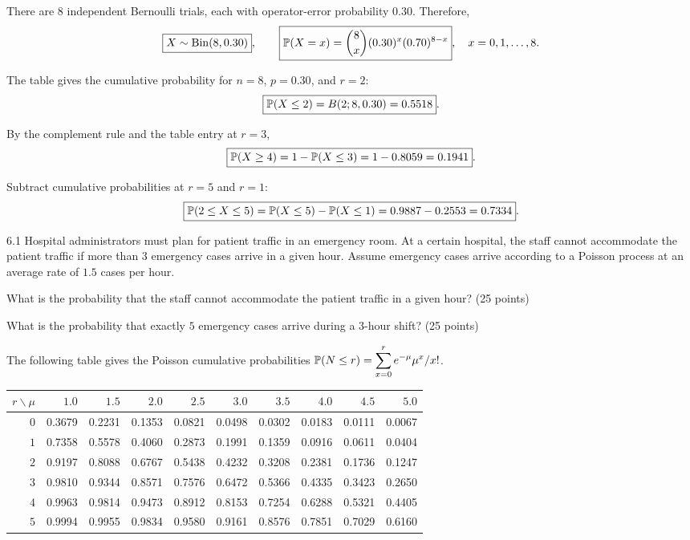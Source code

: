 \documentclass[11pt,oneside]{article}
\begin{document}
\begin{solution}
\begin{problemsubparts}
\item There are $8$ independent Bernoulli trials, each with operator-error probability $0.30$. Therefore,
\[
\boxed{X\sim\operatorname{Bin}(8,0.30)},\qquad
\boxed{\mathbb{P}(X=x)=\displaystyle\binom8x(0.30)^x(0.70)^{8-x}},\quad x=0,1,\ldots,8.
\]
\item The table gives the cumulative probability for $n=8$, $p=0.30$, and $r=2$:
\[
\boxed{\mathbb{P}(X\le2)=B(2;8,0.30)=0.5518}.
\]
\item By the complement rule and the table entry at $r=3$,
\[
\boxed{\mathbb{P}(X\ge4)=1-\mathbb{P}(X\le3)=1-0.8059=0.1941}.
\]
\item Subtract cumulative probabilities at $r=5$ and $r=1$:
\[
\boxed{\mathbb{P}(2\le X\le5)=\mathbb{P}(X\le5)-\mathbb{P}(X\le1)=0.9887-0.2553=0.7334}.
\]
\end{problemsubparts}
\end{solution}

\begin{problem}{6.1}
Hospital administrators must plan for patient traffic in an emergency room. At a certain hospital, the staff cannot accommodate the patient traffic if more than $3$ emergency cases arrive in a given hour. Assume emergency cases arrive according to a Poisson process at an average rate of $1.5$ cases per hour.
\begin{problemsubparts}
\item What is the probability that the staff cannot accommodate the patient traffic in a given hour? (25 points)
\item What is the probability that exactly $5$ emergency cases arrive during a $3$-hour shift? (25 points)
\end{problemsubparts}
\end{problem}

\noindent The following table gives the Poisson cumulative probabilities $\displaystyle\mathbb{P}(N\le r)=\sum_{x=0}^{r} e^{-\mu}\mu^x/x!$.
\begin{center}
\begingroup\scriptsize
\setlength{\tabcolsep}{4pt}
\renewcommand{\arraystretch}{1.22}
\begin{tabular}{r*{9}{r}}
\toprule
$r\backslash\mu$ & $1.0$ & $1.5$ & $2.0$ & $2.5$ & $3.0$ & $3.5$ & $4.0$ & $4.5$ & $5.0$\\
\midrule
$0$ & 0.3679 & 0.2231 & 0.1353 & 0.0821 & 0.0498 & 0.0302 & 0.0183 & 0.0111 & 0.0067\\
$1$ & 0.7358 & 0.5578 & 0.4060 & 0.2873 & 0.1991 & 0.1359 & 0.0916 & 0.0611 & 0.0404\\
$2$ & 0.9197 & 0.8088 & 0.6767 & 0.5438 & 0.4232 & 0.3208 & 0.2381 & 0.1736 & 0.1247\\
$3$ & 0.9810 & 0.9344 & 0.8571 & 0.7576 & 0.6472 & 0.5366 & 0.4335 & 0.3423 & 0.2650\\
$4$ & 0.9963 & 0.9814 & 0.9473 & 0.8912 & 0.8153 & 0.7254 & 0.6288 & 0.5321 & 0.4405\\
$5$ & 0.9994 & 0.9955 & 0.9834 & 0.9580 & 0.9161 & 0.8576 & 0.7851 & 0.7029 & 0.6160\\
\bottomrule
\end{tabular}
\endgroup
\end{center}
\end{document}
